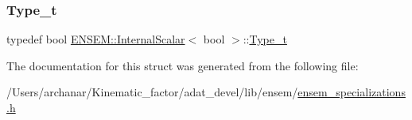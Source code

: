 \subsubsection{\texorpdfstring{Type\_t}{Type\_t}\hspace{0.1cm}{\footnotesize\ttfamily [2/2]}}
{\footnotesize\ttfamily typedef bool \mbox{\hyperlink{structENSEM_1_1InternalScalar}{E\+N\+S\+E\+M\+::\+Internal\+Scalar}}$<$ bool $>$\+::\mbox{\hyperlink{structENSEM_1_1InternalScalar_3_01bool_01_4_a3fe5fad0f8af43221744c3ddb40131a0}{Type\+\_\+t}}}



The documentation for this struct was generated from the following file\+:\begin{DoxyCompactItemize}
\item 
/\+Users/archanar/\+Kinematic\+\_\+factor/adat\+\_\+devel/lib/ensem/\mbox{\hyperlink{lib_2ensem_2ensem__specializations_8h}{ensem\+\_\+specializations.\+h}}\end{DoxyCompactItemize}
